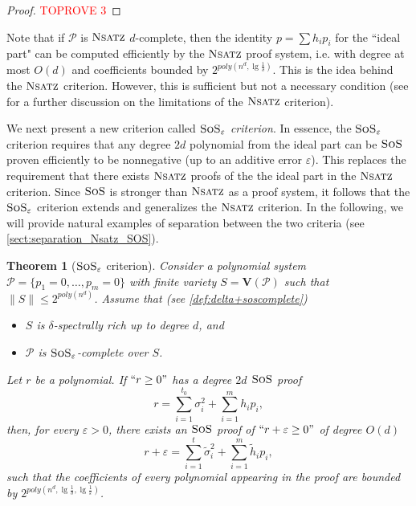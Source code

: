 \documentclass[11pt]{article}
\newcommand{\sos}{\text{\sc{SoS}}}
\newcommand{\Nsatz}{\textsc{Nsatz}}
\newcommand{\Variety}[1]{{\textbf{V}}\left( #1 \right)}
\newcommand{\1}{\textbf{1}}
\newtheorem{theorem}{Theorem}[section]
\begin{document}
\begin{proof}\textcolor{red}{TOPROVE 3}\end{proof}

Note that if $\mathcal{P}$ is $\Nsatz$ $d$-complete, then the identity $p=\sum h_i p_i$ for the ``ideal part" can be computed efficiently by the $\Nsatz$ proof system, i.e. with degree at most $O(d)$ and coefficients bounded by $2^{poly(n^d, \lg \frac{1}{\delta})}$. This is the idea behind the $\Nsatz$ criterion. However, this is sufficient but not a necessary condition (see \cite{raghavendra_weitz2017} for a further discussion on the limitations of the $\Nsatz$ criterion).

We next present a new criterion called \textit{$\sos_{\varepsilon}$ criterion}. In essence, the $\sos_{\varepsilon}$ criterion requires that any degree $2d$ polynomial from the ideal part can be $\sos$ proven efficiently to be nonnegative (up to an additive error $\varepsilon$).  This replaces the requirement that there exists $\Nsatz$ proofs of the the ideal part in the $\Nsatz$ criterion. Since $\sos$ is stronger than $\Nsatz$ as a proof system, it follows that the $\sos_{\varepsilon}$ criterion extends and generalizes the $\Nsatz$ criterion. In the following, we will provide natural examples of separation between the two criteria (see \cref{sect:separation_Nsatz_SOS}).

\begin{theorem}[$\sos_{\varepsilon}$ criterion]\label{th:SoS_Criterion}
    Consider a polynomial system $\mathcal{P}=\{p_1 = 0, \dots, p_m = 0\}$ with finite variety $S = \Variety{\mathcal{P}}$ such that $\| S \| \leq 2^{poly(n^d)}$.
    Assume that (see \cref{def:delta+soscomplete})
    \begin{itemize}
        \item [1)] $S$ is $\delta$-spectrally rich up to degree $d$, and
        \item [2)] $\mathcal{P}$ is $\sos_\varepsilon$-complete over $S$.
    \end{itemize}
    Let $r$ be a polynomial. If $``r \geq 0"$ has a degree $2d$ $\sos$ proof
    \begin{equation*}
        r = \sum_{i=1}^{t_0} \sigma_i^2 + \sum_{i=1}^m h_i p_i,
    \end{equation*}
    then, for every $\varepsilon>0$, there exists an $\sos$ proof of $``r+\varepsilon \geq 0"$ of degree $O(d)$
    \begin{equation}\label{eqn:SOS_criterion}
        r +\varepsilon = \sum_{i=1}^{t} \tilde{\sigma}_i^2 + \sum_{i=1}^m \tilde{h}_i p_i,
    \end{equation}
    such that the coefficients of every polynomial appearing in the proof are bounded by $2^{poly(n^d, \lg \frac{1}{\delta}, \lg \frac{1}{\varepsilon})}$.
\end{theorem}
\end{document}
